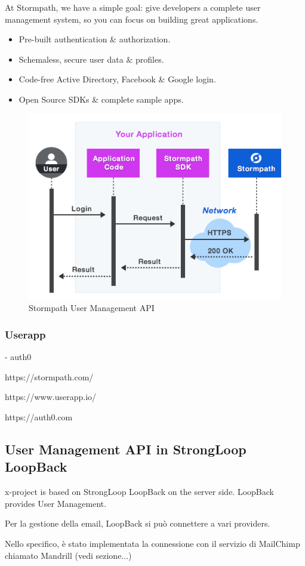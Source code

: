 At Stormpath, we have a simple goal: give developers a complete user management system, so you can focus on building great applications.

\begin{itemize}
\item Pre-built authentication \& authorization.
\item Schemaless, secure user data \& profiles.
\item Code-free Active Directory, Facebook \& Google login.
\item Open Source SDKs \& complete sample apps.
\end{itemize}

\begin {figure}[h]
\graphicspath{{images/chapter_USR/}}
\includegraphics[width=\textwidth]{stormpath}
\caption{Stormpath User Management API}
\end {figure}

\subsubsection{Userapp}



- auth0

https://stormpath.com/

https://www.userapp.io/

https://auth0.com


\subsection{User Management API in StrongLoop LoopBack}

x-project is based on StrongLoop LoopBack on the server side.
LoopBack provides User Management.


Per la gestione della email, LoopBack si può connettere a vari providers.

Nello specifico, è stato implementata la connessione con il servizio di MailChimp chiamato Mandrill (vedi sezione...)

